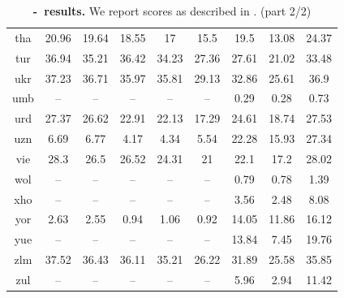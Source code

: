 \begin{table}[htb]
\begin{tabular}{@{}ccccccccc@{}}
        tha & 20.96 & 19.64 & 18.55 & 17 & 15.5 & 19.5 & 13.08 & 24.37 \\
        tur & 36.94 & 35.21 & 36.42 & 34.23 & 27.36 & 27.61 & 21.02 & 33.48 \\
        ukr & 37.23 & 36.71 & 35.97 & 35.81 & 29.13 & 32.86 & 25.61 & 36.9 \\
        umb & -- & -- & -- & -- & -- & 0.29 & 0.28 & 0.73 \\
        urd & 27.37 & 26.62 & 22.91 & 22.13 & 17.29 & 24.61 & 18.74 & 27.53 \\
        uzn & 6.69 & 6.77 & 4.17 & 4.34 & 5.54 & 22.28 & 15.93 & 27.34 \\
        vie & 28.3 & 26.5 & 26.52 & 24.31 & 21 & 22.1 & 17.2 & 28.02 \\
        wol & -- & -- & -- & -- & -- & 0.79 & 0.78 & 1.39 \\
        xho & -- & -- & -- & -- & -- & 3.56 & 2.48 & 8.08 \\
        yor & 2.63 & 2.55 & 0.94 & 1.06 & 0.92 & 14.05 & 11.86 & 16.12 \\
        yue & -- & -- & -- & -- & -- & 13.84 & 7.45 & 19.76 \\
        zlm & 37.52 & 36.43 & 36.11 & 35.21 & 26.22 & 31.89 & 25.58 & 35.85 \\
        zul & -- & -- & -- & -- & -- & 5.96 & 2.94 & 11.42 \\
        \bottomrule
    \end{tabular}
    \caption{\textbf{\fleurs-\sst~\xeng results.} We report \asrbleu scores as described in . (part 2/2)}\label{tbl:fleurs:sst:xeng:p2}
\end{table}
